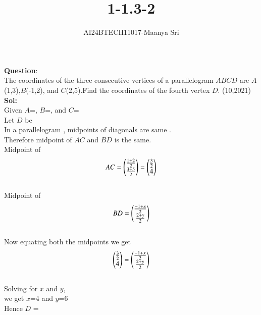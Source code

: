 \documentclass[journal]{IEEEtran}
\begin{document}

\vspace{3cm}

\title{1-1.3-2}
\author{AI24BTECH11017-Maanya Sri
}
{\let\newpage\relax\maketitle}

\renewcommand{\thefigure}{\theenumi}
\renewcommand{\thetable}{\theenumi}
\setlength{\intextsep}{10pt} %


\renewcommand{\thetable}{\theenumi}
\textbf{Question}:\\
The coordinates of the three consecutive vertices of a parallelogram $ABCD$ are $A$ (1,3),$B$(-1,2), and $C$(2,5).Find the coordinates of the fourth vertex $D$.
\hfill(10,2021)
\\ \textbf{Sol:}
\\ Given $A$=,
$B$=, and
$C$=
\\ Let $D$ be 
\\ In a parallelogram , midpoints of diagonals are same .
\\ Therefore midpoint of $AC$ and $BD$ is the same.
\\  Midpoint of
\begin{align}
	AC=\begin{pmatrix}
\frac{1+2}{2}
\\
\frac{3+5}{2}
\end{pmatrix} = \begin{pmatrix}
\frac{3}{2}
\\
4\end{pmatrix}
\end{align}
\\ Midpoint of
\begin{align}
	BD=\begin{pmatrix}
\frac{-1+x}{2}
\\
\frac{2+y}{2}
\end{pmatrix}\end{align}
\\ Now equating both the midpoints we get
\\\begin{align} \begin{pmatrix}
\frac{3}{2}
\\
4
\end{pmatrix} = \begin{pmatrix}
\frac{-1+x}{2}
\\
\frac{2+y}{2}
\end{pmatrix}\end{align}
\\ Solving for $x$ and $y$,
\\ we get $x$=4 and $y$=6
\\ Hence $D$ = 
\end{document}

